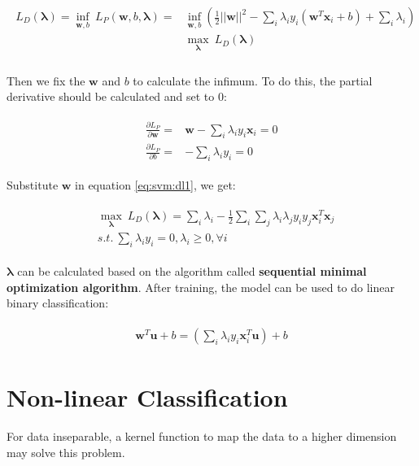 \begin{align}
\begin{split}
L_D(\mathbf{\lambda}) = \inf_{\mathbf{w}, b} \ L_P(\mathbf{w}, b, \mathbf{\lambda}) =& \inf_{\mathbf{w}, b} \left( \frac{1}{2}||\mathbf{w}||^2 - \sum_i\lambda_i y_i(\mathbf{w}^T\mathbf{x}_i+b) + \sum_i\lambda_i \right)\\
&\max_\mathbf{\lambda} \ L_D(\mathbf{\lambda}) \\
\label{eq:svm:dl1}
\end{split}
\end{align}

Then we fix the $\mathbf{w}$ and $b$ to calculate the infimum. 
To do this, the partial derivative should be calculated and set to $0$:

\begin{align}
\begin{split}
\frac{\partial{L_P}}{\partial{\mathbf{w}}} =& \mathbf{w} - \sum_i\lambda_iy_i\mathbf{x}_i = 0 \\
\frac{\partial{L_P}}{\partial{b}} =& -\sum_i\lambda_iy_i = 0
\end{split}
\end{align}

Substitute $\mathbf{w}$ in equation \ref{eq:svm:dl1}, we get:

\begin{align}
\begin{split}
&\max_\mathbf{\lambda} \ L_D(\mathbf{\lambda}) = \sum_i\lambda_i - \frac{1}{2} \sum_i\sum_j\lambda_i\lambda_jy_iy_j\mathbf{x}_i^T\mathbf{x}_j\\
 &s.t. \ \sum_i\lambda_iy_i = 0, \lambda_i \geq 0, \forall i
\label{eq:svm:dl2}
\end{split}
\end{align}

$\mathbf{\lambda}$ can be calculated based on the algorithm called \textbf{sequential minimal optimization algorithm}. After training, the model can be used to do linear binary classification:

\begin{align}
\begin{split}
\mathbf{w}^T \mathbf{u} + b =  \left(\sum_i\lambda_iy_i\mathbf{x}_i^T\mathbf{u}\right) + b 
\end{split}
\end{align}

\section{Non-linear Classification}
For data inseparable, a kernel function to map the data to a higher dimension may solve this problem.

